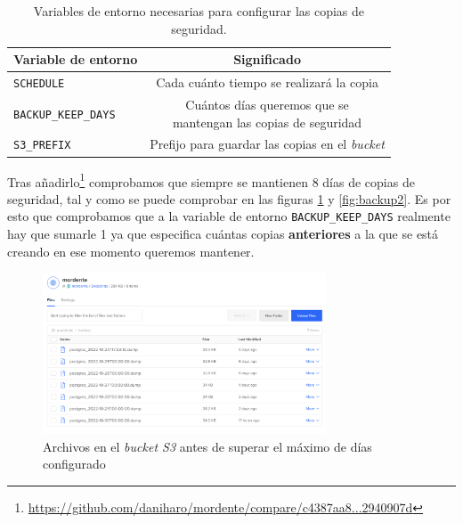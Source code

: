 \begin{table}[]
    \centering
    \begin{tabular}{|l|c|}
        \hline
        \textbf{Variable de entorno} & \textbf{Significado} \\
        \hline
        \texttt{SCHEDULE} & Cada cuánto tiempo se realizará la copia \\
        \hline
        \texttt{BACKUP\_KEEP\_DAYS} & \makecell{Cuántos días queremos que se \\ mantengan las copias de seguridad} \\
        \hline
        \texttt{S3\_PREFIX} & Prefijo para guardar las copias en el \textit{bucket} \\
        \hline
    \end{tabular}
    \caption{Variables de entorno necesarias para configurar las copias de seguridad.}
    \label{tab:envBackup}
\end{table}

Tras añadirlo\footnote{\url{https://github.com/daniharo/mordente/compare/c4387aa8...2940907d}} comprobamos que siempre se mantienen 8 días de copias de seguridad, tal y como se puede comprobar en las figuras \ref{fig:backup1} y \ref{fig:backup2}. Es por esto que comprobamos que a la variable de entorno \texttt{BACKUP\_KEEP\_DAYS} realmente hay que sumarle 1 ya que especifica cuántas copias \textbf{anteriores} a la que se está creando en ese momento queremos mantener.

\begin{figure}[h]
\centering
\includegraphics[width=0.75\textwidth]{imagenes/implementacion/backup_antes_de_borrado_automatico.png}
\caption{Archivos en el \textit{bucket S3} antes de superar el máximo de días configurado}
\label{fig:backup1}
\end{figure}


